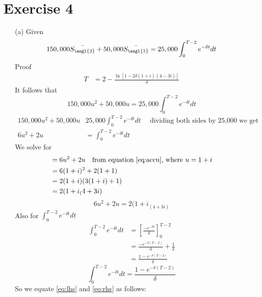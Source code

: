 \documentclass[12pt,a4paper]{article}
\begin{document}
\section*{Exercise 4}
\begin{enumerate}
		\item[(a)] 
		Given
		\begin{align*}
				150,000 \bar{S_{\angl{2}}}  + 50,000  \bar{S_{\angl{1}}} &= 25,000 \int_0^{T-2}  e^{-\delta t} dt\\
		\end{align*}
Proof
\begin{align*}
		T  &= 2 - \frac{ \ln[ 1 -  2\delta (1+i)  (4 -  3i)  ]   }{  \delta }
\end{align*}
It follows that
\begin{equation}
	150,000u^2 + 50,000u  =  25,000 \int_0^{T-2}  e^{-\delta t} dt 
	\label{eq:proof}
\end{equation}
\begin{align*}
   	150,000u^2 + 50,000u  &  25,000 \int_0^{T-2}  e^{-\delta t} dt  \quad \text{ dividing both sides by 25,000 we get}\\
   	6u^2 + 2u &=  \int_0^{T-2}  e^{-\delta t} dt 
\end{align*}
We solve for 
\begin{align*}
		 &= 6u^2 + 2u \quad \text{from equation \eqref{eq:accu},  where } u =  1 + i\\
		 &= 6(1 +i)^2  + 2(1+1)\\
		 &= 2(1+i)(3(1+i)+1)\\
		 &= 2(1+i_(4+3i)
\end{align*}
\begin{equation}
		6u^2 + 2u = 2(1+i_(4+3i)
		\label{eq:lhs}
\end{equation}
Also for $\int_0^{T-2}  e^{-\delta t} dt $\\
\begin{align*}
    \int_0^{T-2}  e^{-\delta t} dt  &=   \left[   \frac{-e^{-\delta t} }{\delta} \right]_0^{T-2}\\
    				&=  \frac{  -e^{ -\delta(T-2) }  }{ \delta }  + \frac{1}{ \delta}\\
    				&=  \frac{  1- e^{-\delta(T-2) }   }{ \delta}
\end{align*}
\begin{equation}
		\int_0^{T-2}  e^{-\delta t} dt =  \frac{  1- e^{-\delta(T-2) }   }{ \delta}
		\label{eq:rhs}
\end{equation}
So we equate \eqref{eq:lhs}  and \eqref{eq:rhs} as follows:\\

\end{enumerate}
\end{document}
